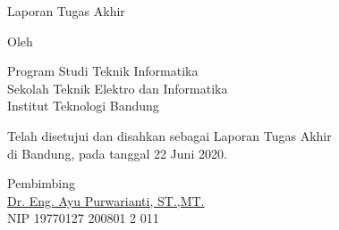 \clearpage
\pagestyle{empty}
\begin{center}
\smallskip

    \Large \bfseries \MakeUppercase{\thetitle}
    \vfill

    \Large Laporan Tugas Akhir
    \vfill

    \large Oleh

    \Large \theauthor

    \large Program Studi Teknik Informatika \\
    \normalsize \normalfont Sekolah Teknik Elektro dan Informatika \\
    Institut Teknologi Bandung \\

    \vfill
    \normalsize \normalfont{
        
    }
    
    Telah disetujui dan disahkan sebagai Laporan Tugas Akhir \\
    di Bandung, pada tanggal 22 Juni 2020.

    \vfill
    \normalsize \normalfont
    Pembimbing\\
    \vfill
    \underline{Dr. Eng. Ayu Purwarianti, ST.,MT.} \\
    NIP 19770127 200801 2 011


\end{center}
\restoregeometry
\clearpage
